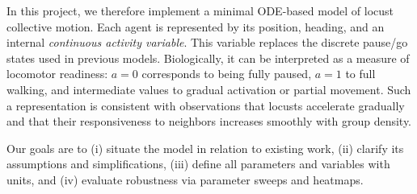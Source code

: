 \documentclass[11pt,a4paper]{article}
\begin{document}
In this project, we therefore implement a minimal ODE-based model of locust collective motion. Each agent is represented by its position, heading, and an internal \emph{continuous activity variable}. This variable replaces the discrete pause/go states used in previous models. Biologically, it can be interpreted as a measure of locomotor readiness: $a=0$ corresponds to being fully paused, $a=1$ to full walking, and intermediate values to gradual activation or partial movement. Such a representation is consistent with observations that locusts accelerate gradually and that their responsiveness to neighbors increases smoothly with group density.  

Our goals are to (i) situate the model in relation to existing work, (ii) clarify its assumptions and simplifications, (iii) define all parameters and variables with units, and (iv) evaluate robustness via parameter sweeps and heatmaps.  



\end{document}
